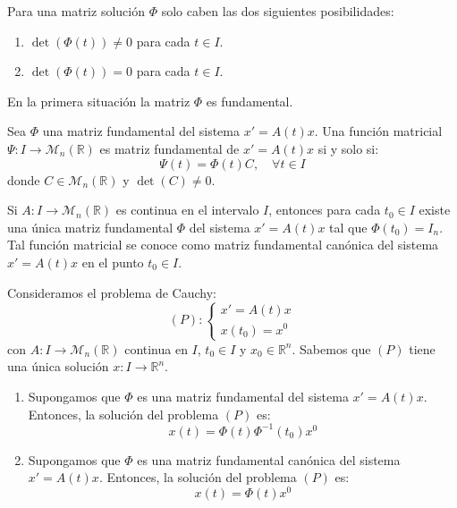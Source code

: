 \begin{corollary}
    Para una matriz solución $\Phi$ solo caben las dos siguientes posibilidades:
    \begin{enumerate}
        \item $\det(\Phi(t)) \neq 0$ para cada $t \in I$.
        \item $\det(\Phi(t)) = 0$ para cada $t \in I$.
    \end{enumerate}
    En la primera situación la matriz $\Phi$ es fundamental.
\end{corollary}

\begin{proposition}
    Sea $\Phi$ una matriz fundamental del sistema $x' = A(t)x$.
    Una función matricial $\Psi: I \to \mathcal{M}_n(\mathbb{R})$ es matriz fundamental de $x' = A(t)x$ si y solo si:
    $$\Psi(t) = \Phi(t)C, \quad \forall t \in I$$
    donde $C \in \mathcal{M}_n(\mathbb{R})$ y $\det(C) \neq 0$.
\end{proposition}

\begin{proposition}
    Si $A: I \to \mathcal{M}_n(\mathbb{R})$ es continua en el intervalo $I$, entonces para cada $t_0 \in I$ existe una única matriz fundamental $\Phi$ del sistema $x' = A(t)x$ tal que $\Phi(t_0) = I_n$.
    Tal función matricial se conoce como matriz fundamental canónica del sistema $x' = A(t)x$ en el punto $t_0 \in I$.
\end{proposition}

\begin{remark}
    Consideramos el problema de Cauchy:
    $$(P): \begin{cases}
            x' = A(t)x \\
            x(t_0) = x^0
        \end{cases}$$
    con $A : I \to \mathcal{M}_n(\mathbb{R})$ continua en $I$, $t_0 \in I$ y $x_0 \in \mathbb{R}^n$.
    Sabemos que $(P)$ tiene una única solución $x: I \to \mathbb{R}^n$.
    \begin{enumerate}
        \item Supongamos que $\Phi$ es una matriz fundamental del sistema $x' = A(t)x$.
              Entonces, la solución del problema $(P)$ es:
              $$x(t) = \Phi(t)\Phi^{-1}(t_0)x^0$$
        \item Supongamos que $\Phi$ es una matriz fundamental canónica del sistema $x' = A(t)x$.
              Entonces, la solución del problema $(P)$ es:
              $$x(t) = \Phi(t)x^0$$
    \end{enumerate}
\end{remark}

